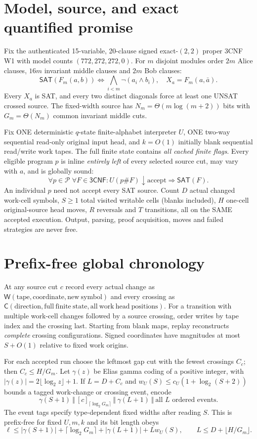 \documentclass[11pt]{article}
\newcommand{\SAT}{\mathsf{SAT}}
\begin{document}
\section{Model, source, and exact quantified promise}
Fix the authenticated 15-variable, 20-clause signed exact-$(2,2)$
proper 3CNF W1 with model counts $(772,272,272,0)$.
For $m$ disjoint modules order $2m$ Alice clauses,
$16m$ invariant middle clauses and $2m$ Bob clauses:
\[
\SAT(F_m(a,b))\iff \bigwedge_{i<m}\neg(a_i\land b_i),
\quad X_a=F_m(a,\bar a).
\]
Every $X_a$ is SAT, and every two distinct diagonals force at
least one UNSAT crossed source. The fixed-width source has
$N_m=\Theta(m\log(m+2))$ bits with $G_m=\Theta(N_m)$
common invariant middle cuts.

Fix ONE deterministic $q$-state finite-alphabet interpreter $U$,
ONE two-way sequential read-only original input head,
and $k=O(1)$ initially blank sequential read/write work tapes.
The full finite state contains \emph{all cached finite flags}.
Every eligible program $p$ is inline \emph{entirely left} of every
selected source cut, may vary with $a$, and is globally sound:
\[
\forall p\in\mathcal P\;\forall F\in\mathsf{3CNF}:
 U(p\#F)\downarrow\mathrm{accept}\Longrightarrow \SAT(F).
\tag{1}
\]
An individual $p$ need not accept every SAT source.
Count $D$ actual changed work-cell symbols, $S\ge1$ total
visited writable cells (blanks included), $H$ one-cell
original-source head moves, $R$ reversals and $T$ transitions,
all on the SAME accepted execution. Output, parsing,
proof acquisition, moves and failed strategies are never free.

\section{Prefix-free global chronology}
At any source cut $c$ record every actual change as
$\mathsf W(\mathrm{tape},\mathrm{coordinate},\mathrm{new\ symbol})$
and every crossing as
$\mathsf C(\mathrm{direction},\mathrm{full\ finite\ state},
\mathrm{all\ work\ head\ positions})$.
For a transition with multiple work-cell changes followed by
a source crossing, order writes by tape index and the crossing last.
Starting from blank maps, replay reconstructs \emph{complete}
crossing configurations. Signed coordinates have magnitudes at
most $S+O(1)$ relative to fixed work origins.

For each accepted run choose the leftmost gap cut with the fewest
crossings $C_c$; then $C_c\le H/G_m$. Let $\gamma(z)$ be Elias gamma
coding of a positive integer, with
$|\gamma(z)|=2\lfloor\log_2z\rfloor+1$.
If $L=D+C_c$ and
$w_U(S)\le c_U(1+\log_2(S+2))$
bounds a tagged work-change or crossing event, encode
\[
\gamma(S+1)\ \Vert\
[c]_{\lceil\log_2G_m\rceil}\ \Vert\
\gamma(L+1)\ \Vert\ \text{all $L$ ordered events}.
\tag{2}
\]
The event tags specify type-dependent fixed widths after reading
$S$. This is prefix-free for fixed $U,m,k$ and its bit length obeys
\[
\ell\le|\gamma(S+1)|+\lceil\log_2G_m\rceil+
|\gamma(L+1)|+Lw_U(S),\qquad
L\le D+\lfloor H/G_m\rfloor .                          \tag{3}
\]
\end{document}
